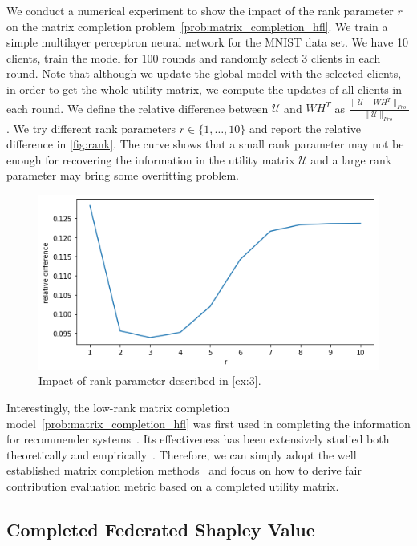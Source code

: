 \begin{example} \label{ex:3}
    We conduct a numerical experiment to show the impact of the rank parameter $r$ on the matrix completion problem~\eqref{prob:matrix_completion_hfl}. We train a simple multilayer perceptron neural network for the MNIST data set. We have 10 clients, train the model for 100 rounds and randomly select 3 clients in each round. Note that although we update the global model with the selected clients, in order to get the whole utility matrix, we compute the updates of all clients in each round. We define the relative difference between $\mathcal{U}$ and $WH^T$ as 
    $\frac{\|\mathcal{U} - WH^T\|_{Fro}}{\|\mathcal{U}\|_{Fro}}$.
    We try different rank parameters $r \in \{1, \dots, 10\}$ and report the relative difference in \autoref{fig:rank}. The curve shows that a small rank parameter may not be enough for recovering the information in the utility matrix $\mathcal{U}$ and a large rank parameter may bring some overfitting problem.  
    
    \begin{figure}[t]
        \centering
        \includegraphics[width=.7\textwidth]{./figures/rank_impact.png}
        \caption{Impact of rank parameter described in \autoref{ex:3}.}
        \label{fig:rank}
    \end{figure}
    
\end{example}

Interestingly, the low-rank matrix completion model~\eqref{prob:matrix_completion_hfl} was first used in completing the information for recommender systems~\citep{koren2009matrix}. Its effectiveness has been extensively studied both theoretically and empirically~\citep{keshavan2012efficient, sun2016guaranteed}.  Therefore, we can simply adopt the well established matrix completion methods~\citep{yu2014parallel, chin2016libmf} and focus on how to derive fair contribution evaluation metric based on a completed utility matrix.
    
\subsection{Completed Federated Shapley Value} \label{sec:7-6-4}

